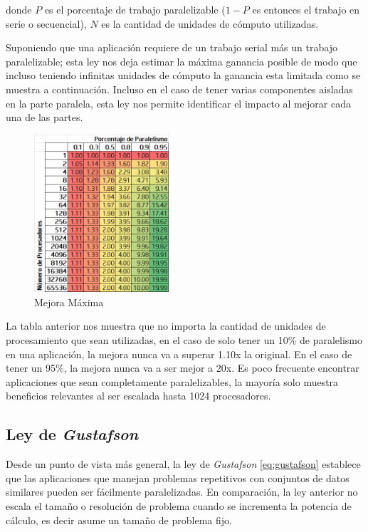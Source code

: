 \documentclass[a4paper]{report}
\begin{document}
donde $ P $ es el porcentaje de trabajo paralelizable ($ 1-P $ es entonces el trabajo en serie o secuencial), $ N $ es la cantidad de unidades de c\'omputo utilizadas.

\bigskip

Suponiendo que una aplicaci\'on requiere de un trabajo serial m\'as un trabajo paralelizable; esta ley nos deja estimar la m\'axima ganancia posible
de modo que incluso teniendo infinitas unidades de c\'omputo la ganancia esta limitada como se muestra a continuaci\'on. Incluso en el caso de tener varias
componentes aisladas en la parte paralela, esta ley nos permite identificar el impacto al mejorar cada una de las partes.

\begin{figure}[H]
\begin{center}
\includegraphics[width=5cm]{amdahl.png}
\caption{Mejora M\'axima}
\end{center}
\end{figure}

La tabla anterior nos muestra que no importa la cantidad de unidades de procesamiento que sean utilizadas, en el caso de solo tener un 10\% de paralelismo
en una aplicaci\'on, la mejora nunca va a superar 1.10x la original. En el caso de tener un 95\%, la mejora nunca va a ser mejor a 20x. Es poco frecuente encontrar
aplicaciones que sean completamente paralelizables, la mayor\'ia solo muestra
beneficios relevantes al ser escalada hasta 1024 procesadores.

\subsection{Ley de {\it Gustafson}}

Desde un punto de vista m\'as general, la ley de {\it Gustafson}
\cite{gustafson} \ref{eq:gustafson} establece que las aplicaciones que manejan problemas
repetitivos con conjuntos de datos similares pueden ser f\'acilmente
paralelizadas. En comparaci\'on, la ley anterior no escala el tama\~no o
resoluci\'on de problema cuando se incrementa la potencia de c\'alculo, es
decir asume un tama\~no de problema fijo. 
\end{document}
